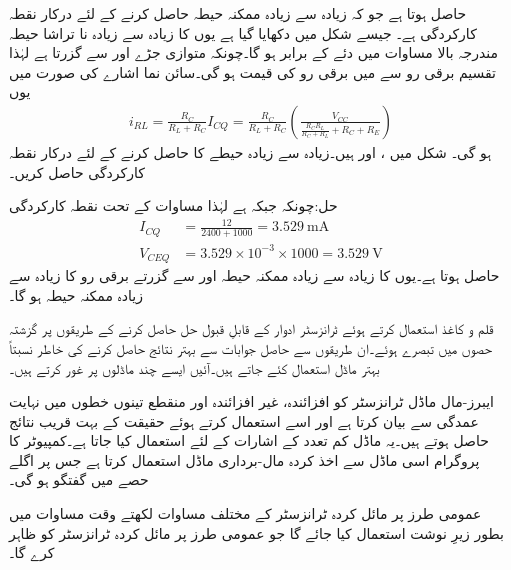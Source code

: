 حاصل ہوتا ہے جو کہ زیادہ سے زیادہ ممکنہ حیطہ حاصل کرنے کے لئے درکار نقطہ کارکردگی ہے۔ جیسے شکل  میں دکھایا گیا ہے یوں  کا زیادہ سے زیادہ نا تراشا حیطہ مندرجہ بالا مساوات میں دئے  کے برابر ہو گا۔چونکہ  متوازی جڑے  اور  سے گزرتا ہے لہٰذا تقسیم برقی رو سے  میں برقی رو  کی قیمت   ہو گی۔سائن نما اشارے کی صورت میں یوں
\begin{align}
i_{RL}=\frac{R_C}{R_L+R_C} I_{CQ} =\frac{R_C}{R_L+R_C}\left(\frac{V_{CC}}{\frac{R_C  R_L}{R_C + R_L}+R_C+R_E}\right)
\end{align}
ہو گی۔
شکل  میں ،  اور  ہیں۔زیادہ سے زیادہ حیطے کا   حاصل کرنے کے لئے درکار نقطہ کارکردگی حاصل کریں۔

حل:چونکہ  جبکہ  ہے لہٰذا مساوات  کے تحت نقطہ کارکردگی
\begin{align*}
I_{CQ}&=\frac{12}{2400+1000}=\SI{3.529}{\milli \ampere}\\
V_{CEQ}&=3.529 \times 10^{-3} \times 1000=\SI{3.529}{\volt}
\end{align*} 
حاصل ہوتا ہے۔یوں   کا زیادہ سے زیادہ ممکنہ حیطہ   اور  سے گزرتے برقی رو  کا زیادہ سے زیادہ ممکنہ حیطہ  ہو گا۔

قلم و کاغذ استعمال کرتے ہوئے ٹرانزسٹر ادوار کے قابلِ قبول حل حاصل کرنے کے طریقوں پر گزشتہ حصوں میں تبصرے ہوئے۔ان طریقوں سے حاصل جوابات سے بہتر نتائج حاصل کرنے کی خاطر نسبتاً بہتر ماڈل استعمال کئے جاتے ہیں۔آئیں ایسے چند ماڈلوں پر غور کرتے ہیں۔

ایبرز-مال ماڈل  ٹرانزسٹر کو افزائندہ، غیر افزائندہ اور منقطع تینوں خطوں میں نہایت عمدگی سے بیان کرتا ہے اور اسے استعمال کرتے ہوئے حقیقت کے بہت قریب نتائج حاصل ہوتے ہیں۔یہ ماڈل کم تعدد کے اشارات کے لئے استعمال کیا جاتا ہے۔کمپیوٹر کا پروگرام   اسی ماڈل سے اخذ کردہ مال-برداری ماڈل  استعمال کرتا ہے جس پر اگلے حصے میں گفتگو ہو گی۔

عمومی طرز پر مائل کردہ  ٹرانزسٹر کے مختلف مساوات لکھتے وقت مساوات میں  بطور زیرِ نوشت استعمال کیا جائے گا جو عمومی طرز پر مائل کردہ ٹرانزسٹر کو ظاہر کرے گا۔

